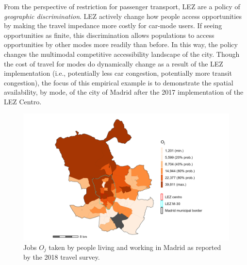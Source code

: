 \documentclass[numbered]{trbunofficial}
\begin{document}
From the perspective of restriction for passenger transport, LEZ are a
policy of \emph{geographic discrimination}. LEZ actively change how
people access opportunities by making the travel impedance more costly
for car-mode users. If seeing opportunities as finite, this
discrimination allows populations to access opportunities by other modes
more readily than before. In this way, the policy changes the multimodal
competitive accessibility landscape of the city. Though the cost of
travel for modes do dynamically change as a result of the LEZ
implementation (i.e., potentially less car congestion, potentially more
transit congestion), the focus of this empirical example is to
demonstrate the spatial availability, by mode, of the city of Madrid
after the 2017 implementation of the LEZ Centro.

\begin{figure}

{\centering \includegraphics[width=1\linewidth]{images/i_jobs_zn208_plot} 

}

\caption{\label{fig:Fig2} Jobs $O_j$ taken by people living and working in Madrid as reported by the 2018 travel survey.}\label{fig:jobs-plot}
\end{figure}
\end{document}
